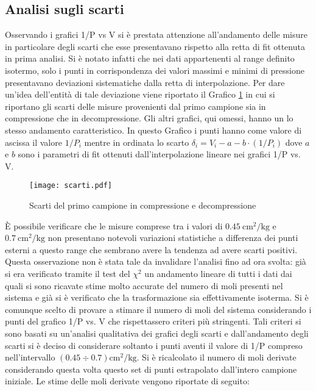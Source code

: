 \documentclass[a4paper,11pt,oneside]{article}
\begin{document}
\subsection{Analisi sugli scarti}
Osservando i grafici 1/P vs V si è prestata attenzione all'andamento delle misure in particolare degli scarti che esse presentavano rispetto alla retta di fit ottenuta in prima analisi. Si è notato infatti che nei dati appartenenti al range definito isotermo, solo i punti in corrispondenza dei valori massimi e minimi di pressione presentavano deviazioni sistematiche dalla retta di interpolazione. Per dare un'idea dell'entità di tale deviazione viene riportato il Grafico \ref{fig:scarti} in cui si riportano gli scarti delle misure provenienti dal primo campione sia in compressione che in decompressione. Gli altri grafici, qui omessi, hanno un lo stesso andamento caratteristico. In questo Grafico i punti hanno come valore di ascissa il valore $1/P_{i}$ mentre in ordinata lo scarto $\delta_{i}=V_{i} - a - b \cdot (1/P_{i})$ dove $a$ e $b$ sono i parametri di fit ottenuti dall'interpolazione lineare nei grafici 1/P vs. V.

\begin{figure}
    \centering
    \texttt{[image: scarti.pdf]}
    \caption{Scarti del primo campione in compressione e decompressione}
    \label{fig:scarti}
\end{figure}

È possibile verificare che le misure comprese tra i valori di $\SI{0.45}{\centi\meter\squared\per\kilogram}$ e $\SI{0.7}{\centi\meter\squared\per\kilogram}$ non presentano notevoli variazioni statistiche a differenza dei punti esterni a questo range che sembrano avere la tendenza ad avere scarti positivi. Questa osservazione non è stata tale da invalidare l'analisi fino ad ora svolta: già si era verificato tramite il test del $\chi^{2}$ un andamento lineare di tutti i dati dai quali si sono ricavate stime molto accurate del numero di moli presenti nel sistema e già si è verificato che la trasformazione sia effettivamente isoterma. Si è comunque scelto di provare a stimare il numero di moli del sistema considerando i punti del grafico 1/P vs. V che rispettassero criteri più stringenti. Tali criteri si sono basati su un'analisi qualitativa dei grafici degli scarti e dall'andamento degli scarti si è deciso di considerare soltanto i punti aventi il valore di 1/P compreso nell'intervallo $(0.45 \div 0.7) \si{\centi\meter\squared\per\kilogram}$. Si è ricalcolato il numero di moli derivate considerando questa volta questo set di punti estrapolato dall'intero campione iniziale. Le stime delle moli derivate vengono riportate di seguito:
\end{document}
